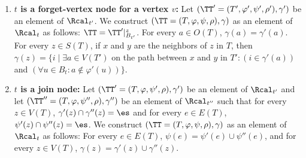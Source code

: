 \begin{enumerate}
\medskip
\item
{\bf $t$ is a forget-vertex node for a vertex $v$:} Let $(\TT' = (T',\varphi',\psi',\rho'),\gamma')$ be an element of $\Rcal_{t'}$.
We construct $(\TT = (T,\varphi,\psi,\rho),\gamma)$ as an element of $\Rcal_t$ as follows: $\TT = \TT'|^z_{B_{t'}}$.
For every $a \in O(T)$, $\gamma(a) = \gamma'(a)$.
For every $z \in S(T)$, if $x$ and $y$ are the neighbors of $z$ in $T$, then $\gamma(z) = \{i \mid \exists a \in V(T')$ on the path between $x$ and $y$ in $T' : (i \in \gamma'(a))$ and $(\forall u \in B_{t}: a \not \in \varphi'(u))\}$.

\medskip
\item
{\bf $t$ is a join node:}
Let $(\TT' = (T,\varphi,\psi',\rho),\gamma')$ be an element of $\Rcal_{t'}$ and
let $(\TT'' = (T,\varphi,\psi'',\rho),\gamma'')$ be an element of $\Rcal_{t''}$ such that
for every $z \in V(T)$, $\gamma'(z) \cap \gamma''(z) = \es$ and
for every $e \in E(T)$, $\psi'(z) \cap \psi''(z) = \es$. We construct $(\TT = (T,\varphi,\psi,\rho),\gamma)$ as an element of $\Rcal_t$ as follows:
For every $e \in E(T)$, $\psi(e) = \psi'(e) \cup \psi''(e)$, and
 for every $z \in V(T)$, $\gamma(z) = \gamma'(z) \cup \gamma''(z)$.

\end{enumerate}





